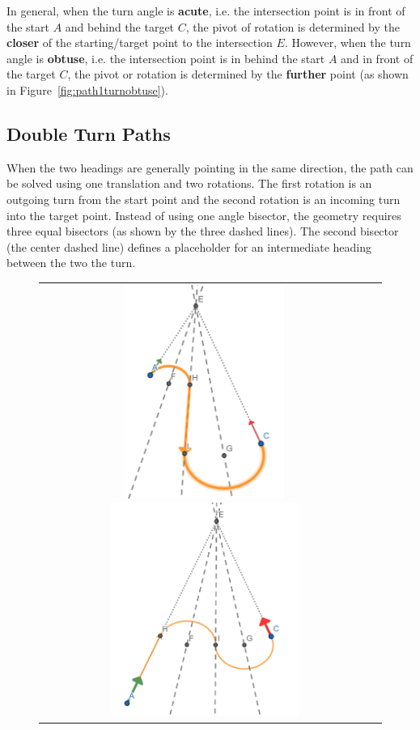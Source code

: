 \documentclass{article}
\begin{document}
In general, when the turn angle is \textbf{acute}, 
i.e. the intersection point is in front of the start $A$ and behind the target $C$, 
the pivot of rotation is determined by the \textbf{closer}
of the starting/target point to the intersection $E$.
However, when the turn angle is \textbf{obtuse}, i.e. the intersection point is in behind the start $A$ and in front of the target $C$, 
the pivot or rotation is determined by the \textbf{further}
point (as shown in Figure~\ref{fig:path1turnobtuse}).

\clearpage
\subsection*{Double Turn Paths}
When the two headings are generally pointing in the same direction, the path can be solved using one translation
and two rotations. The first rotation is an outgoing turn from the start point and the second rotation is
an incoming turn into the target point.
Instead of using one angle bisector, the geometry requires three equal bisectors (as shown by 
the three dashed lines). The second bisector (the center dashed line) defines a placeholder for an intermediate heading 
between the two the turn.

\begin{figure}[hbt]
  \begin{tabular}{cc}
    \includegraphics[height=7cm]{screenshots/double-acute-turn-rot-trans.png}
    \includegraphics[height=7cm]{screenshots/double-acute-turn-trans-rot.png}
  \end{tabular}
\end{figure}
\end{document}
